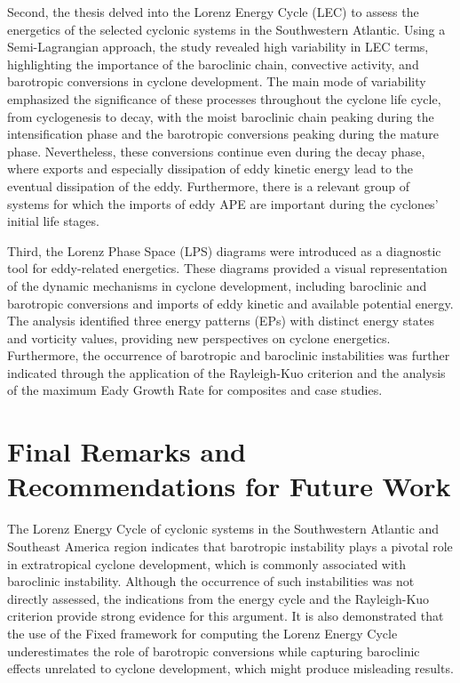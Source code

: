 Second, the thesis delved into the Lorenz Energy Cycle (LEC) to assess the energetics of the selected cyclonic systems in the Southwestern Atlantic. Using a Semi-Lagrangian approach, the study revealed high variability in LEC terms, highlighting the importance of the baroclinic chain, convective activity, and barotropic conversions in cyclone development. The main mode of variability emphasized the significance of these processes throughout the cyclone life cycle, from cyclogenesis to decay, with the moist baroclinic chain peaking during the intensification phase and the barotropic conversions peaking during the mature phase. Nevertheless, these conversions continue even during the decay phase, where exports and especially dissipation of eddy kinetic energy lead to the eventual dissipation of the eddy. Furthermore, there is a relevant group of systems for which the imports of eddy APE are important during the cyclones' initial life stages.

Third, the Lorenz Phase Space (LPS) diagrams were introduced as a diagnostic tool for eddy-related energetics. These diagrams provided a visual representation of the dynamic mechanisms in cyclone development, including baroclinic and barotropic conversions and imports of eddy kinetic and available potential energy. The analysis identified three energy patterns (EPs) with distinct energy states and vorticity values, providing new perspectives on cyclone energetics. Furthermore, the occurrence of barotropic and baroclinic instabilities was further indicated through the application of the Rayleigh-Kuo criterion and the analysis of the maximum Eady Growth Rate for composites and case studies.

\section{Final Remarks and Recommendations for Future Work}

The Lorenz Energy Cycle of cyclonic systems in the Southwestern Atlantic and Southeast America region indicates that barotropic instability plays a pivotal role in extratropical cyclone development, which is commonly associated with baroclinic instability. Although the occurrence of such instabilities was not directly assessed, the indications from the energy cycle and the Rayleigh-Kuo criterion provide strong evidence for this argument. It is also demonstrated that the use of the Fixed framework for computing the Lorenz Energy Cycle underestimates the role of barotropic conversions while capturing baroclinic effects unrelated to cyclone development, which might produce misleading results. 

